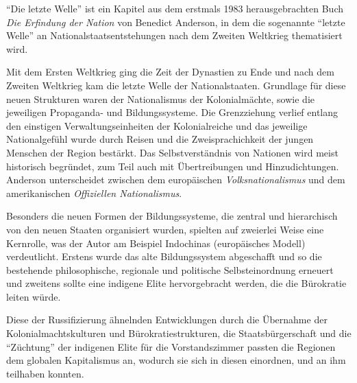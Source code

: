 \documentclass[a4paper, 12pt]{article}
\begin{document}
\begin{onehalfspace} 





\noindent 
"`Die letzte Welle"' ist ein Kapitel aus dem erstmals 1983 herausgebrachten Buch \emph{Die Erfindung der Nation} von Benedict Anderson, in dem die sogenannte "`letzte Welle"' an Nationalstaatsentstehungen nach dem Zweiten Weltkrieg thematisiert wird.

Mit dem Ersten Weltkrieg ging die Zeit der Dynastien zu Ende und nach dem Zweiten Weltkrieg kam die letzte Welle der Nationalstaaten. Grundlage für diese neuen Strukturen waren der Nationalismus der Kolonialmächte, sowie die jeweiligen Propaganda- und Bildungssysteme. Die Grenzziehung verlief entlang den einstigen Verwaltungseinheiten der Kolonialreiche und das jeweilige Nationalgefühl wurde durch Reisen und die Zweisprachichkeit der jungen Menschen der Region bestärkt. Das Selbstverständnis von Nationen wird meist historisch begründet, zum Teil auch mit Übertreibungen und Hinzudichtungen. Anderson unterscheidet zwischen dem europäischen \emph{Volksnationalismus} und dem amerikanischen \emph{Offiziellen Nationalismus}.

Besonders die neuen Formen der Bildungssysteme, die zentral und hierarchisch von den neuen Staaten organisiert wurden, spielten auf zweierlei Weise eine Kernrolle, was der Autor am Beispiel Indochinas (europäisches Modell) verdeutlicht. Erstens wurde das alte Bildungssystem abgeschafft und so die bestehende philosophische, regionale und politische Selbsteinordnung erneuert und zweitens sollte eine indigene Elite hervorgebracht werden, die die Bürokratie leiten würde. 

Diese der Russifizierung ähnelnden Entwicklungen durch die Übernahme der Kolonialmachtskulturen und Bürokratiestrukturen, die Staatsbürgerschaft und die "`Züchtung"' der indigenen Elite für die Vorstandszimmer passten die Regionen dem globalen Kapitalismus an, wodurch sie sich in diesen einordnen, und an ihm teilhaben konnten.







\end{onehalfspace}
\nocite{*}
%
\printbibliography
\end{document}
